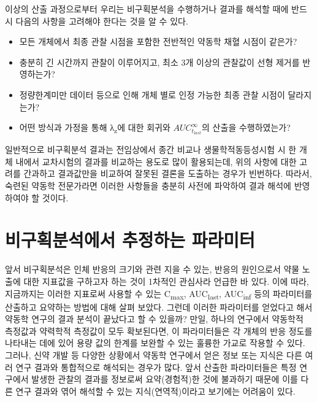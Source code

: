 \documentclass[
  11pt,
  krantz2, a4paper, twoside]{krantz}
\providecommand{\tightlist}{%
  \setlength{\itemsep}{0pt}\setlength{\parskip}{0pt}}
\theoremstyle{definition}
\theoremstyle{definition}
\theoremstyle{definition}
\theoremstyle{definition}
\theoremstyle{remark}
\begin{document}
이상의 산출 과정으로부터 우리는 비구획분석을 수행하거나 결과를 해석할 때에 반드시 다음의 사항을 고려해야 한다는 것을 알 수 있다.

\begin{itemize}
\tightlist
\item
  모든 개체에서 최종 관찰 시점을 포함한 전반적인 약동학 채혈 시점이 같은가?
\item
  충분히 긴 시간까지 관찰이 이루어지고, 최소 3개 이상의 관찰값이 선형 제거를 반영하는가?
\item
  정량한계미만 데이터 등으로 인해 개체 별로 인정 가능한 최종 관찰 시점이 달라지는가?
\item
  어떤 방식과 가정을 통해 λ\textsubscript{z}에 대한 회귀와 \({AUC}_{t_{{last}}}^{\infty}\)의 산출을 수행하였는가?
\end{itemize}

일반적으로 비구획분석 결과는 전임상에서 종간 비교나 생물학적동등성시험 시 한 개체 내에서 교차시험의 결과를 비교하는 용도로 많이 활용되는데, 위의 사항에 대한 고려를 간과하고 결과값만을 비교하여 잘못된 결론을 도출하는 경우가 빈번하다. 따라서, 숙련된 약동학 전문가라면 이러한 사항들을 충분히 사전에 파악하여 결과 해석에 반영하여야 할 것이다.

\hypertarget{uxbe44uxad6cuxd68duxbd84uxc11duxc5d0uxc11c-uxcd94uxc815uxd558uxb294-uxd30cuxb77cuxbbf8uxd130}{%
\section{비구획분석에서 추정하는 파라미터}\label{uxbe44uxad6cuxd68duxbd84uxc11duxc5d0uxc11c-uxcd94uxc815uxd558uxb294-uxd30cuxb77cuxbbf8uxd130}}

앞서 비구획분석은 인체 반응의 크기와 관련 지을 수 있는, 반응의 원인으로서 약물 노출에 대한 지표값을 구하고자 하는 것이 1차적인 관심사라 언급한 바 있다.
이에 따라, 지금까지는 이러한 지표로써 사용할 수 있는 C\textsubscript{max}, AUC\textsubscript{last}, AUC\textsubscript{inf} 등의 파라미터를 산출하고 요약하는 방법에 대해 살펴 보았다.
그런데 이러한 파라미터를 얻었다고 해서 약동학 연구의 결과 분석이 끝났다고 할 수 있을까?
만일, 하나의 연구에서 약동학적 측정값과 약력학적 측정값이 모두 확보된다면, 이 파라미터들은 각 개체의 반응 정도를 나타내는 데에 있어 용량 값의 한계를 보완할 수 있는 훌륭한 가교로 작용할 수 있다.
그러나, 신약 개발 등 다양한 상황에서 약동학 연구에서 얻은 정보 또는 지식은 다른 여러 연구 결과와 통합적으로 해석되는 경우가 많다.
앞서 산출한 파라미터들은 특정 연구에서 발생한 관찰의 결과를 정보로써 요약(경험적)한 것에 불과하기 때문에 이를 다른 연구 결과와 엮어 해석할 수 있는 지식(연역적)이라고 보기에는 어려움이 있다.
\end{document}

